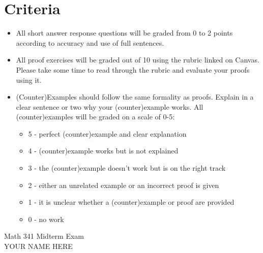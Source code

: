 \documentclass[12pt]{article}
\begin{document}
	\section*{Criteria}
		\begin{itemize}
			\item All short answer response questions will be graded from 0 to 2 points according to accuracy and use of full sentences.
			\item All proof exercises will be graded out of 10 using the rubric linked on Canvas. Please take some time to read through the rubric and evaluate your proofs using it.
			\item (Counter)Examples should follow the same formality as proofs. Explain in a clear sentence or two why your (counter)example works.  All (counter)examples will be graded on a scale of 0-5:
			\begin{itemize}
				\item 5 - perfect (counter)example and clear explanation
				\item 4 - (counter)example works but is not explained
				\item 3 - the (counter)example doesn't work but is on the right track
				\item 2 - either an unrelated example or an incorrect proof is given
				\item 1 - it is unclear whether a (counter)example or proof are provided
				\item 0 - no work
			\end{itemize}
		\end{itemize}
	\newpage
	\restoregeometry
\begin{center}
	Math 341 Midterm Exam\\
	YOUR NAME HERE
\end{center} 
\end{document}
